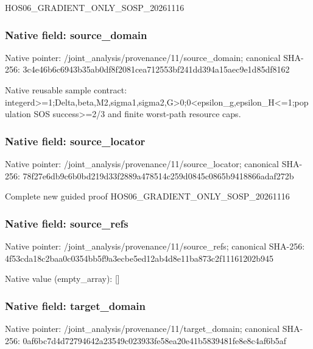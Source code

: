\documentclass[10pt,a4paper]{article}
\begin{document}
\begingroup\raggedright\sloppy HOS06\_\allowbreak{}GRADIENT\_\allowbreak{}ONLY\_\allowbreak{}SOSP\_\allowbreak{}20261116\par\endgroup

\subsubsection{Native field: source\_\allowbreak{}domain}
Native pointer: /joint\_\allowbreak{}analysis/provenance/11/source\_\allowbreak{}domain; canonical SHA-256: 3c4e46b6c6943b35ab0df8f2081cea712553bf241dd394a15aec9e1d85df8162

\begingroup\raggedright\sloppy Native reusable sample contract:\allowbreak{} integerd>=\allowbreak{}1;\allowbreak{}Delta,\allowbreak{}beta,\allowbreak{}M2,\allowbreak{}sigma1,\allowbreak{}sigma2,\allowbreak{}G>0;\allowbreak{}0<epsilon\_\allowbreak{}g,\allowbreak{}epsilon\_\allowbreak{}H<=\allowbreak{}1;\allowbreak{}population SOS success>=\allowbreak{}2/\allowbreak{}3 and finite worst-path resource caps.\par\endgroup

\subsubsection{Native field: source\_\allowbreak{}locator}
Native pointer: /joint\_\allowbreak{}analysis/provenance/11/source\_\allowbreak{}locator; canonical SHA-256: 78f27e6db9c6b0bd219d33f2889a478514c259d0845c0865b9418866adaf272b

\begingroup\raggedright\sloppy Complete new guided proof HOS06\_\allowbreak{}GRADIENT\_\allowbreak{}ONLY\_\allowbreak{}SOSP\_\allowbreak{}20261116\par\endgroup

\subsubsection{Native field: source\_\allowbreak{}refs}
Native pointer: /joint\_\allowbreak{}analysis/provenance/11/source\_\allowbreak{}refs; canonical SHA-256: 4f53cda18c2baa0c0354bb5f9a3ecbe5ed12ab4d8e11ba873c2f11161202b945

Native value (empty\_\allowbreak{}array): []

\subsubsection{Native field: target\_\allowbreak{}domain}
Native pointer: /joint\_\allowbreak{}analysis/provenance/11/target\_\allowbreak{}domain; canonical SHA-256: 0af6bc7d4d72794642a23549c023933fe58ea20e41b5839481fe8e8c4af6b5af
\end{document}
